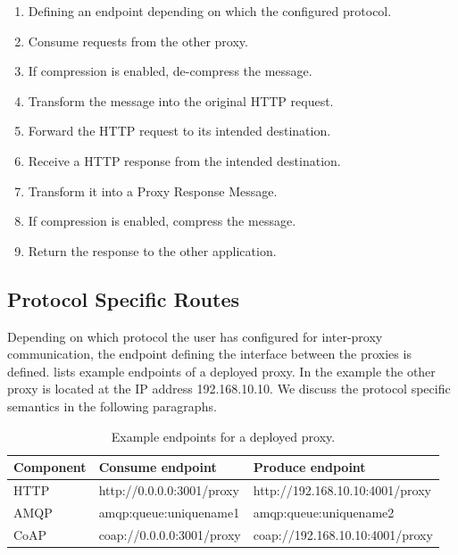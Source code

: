 \begin{enumerate}
	\item Defining an endpoint depending on which the configured protocol.
	\item Consume requests from the other proxy.
	\item If compression is enabled, de-compress the message.
	\item Transform the message into the original HTTP request.
	\item Forward the HTTP request to its intended destination.
	\item Receive a HTTP response from the intended destination.
	\item Transform it into a Proxy Response Message.
	\item If compression is enabled, compress the message.
	\item Return the response to the other application.
\end{enumerate}

\subsection{Protocol Specific Routes}
\label{section:protocol-routes}

Depending on which protocol the user has configured for inter-proxy
communication, the endpoint defining the interface between the proxies is
defined.  lists example endpoints of a deployed
proxy. In the example the other proxy is located at the IP address
192.168.10.10. We discuss the protocol specific semantics in the following
paragraphs.

\begin{table}[h]
\begin{tabular}{|l|l|l|}
\hline
\textbf{Component} & \textbf{Consume endpoint} & \textbf{Produce endpoint}       \\ \hline
HTTP               & http://0.0.0.0:3001/proxy & http://192.168.10.10:4001/proxy \\ \hline
AMQP               & amqp:queue:uniquename1    & amqp:queue:uniquename2          \\ \hline
CoAP               & coap://0.0.0.0:3001/proxy & coap://192.168.10.10:4001/proxy \\ \hline
\end{tabular}
\caption{Example endpoints for a deployed proxy.}
\label{table:example-endpoints}
\end{table}


